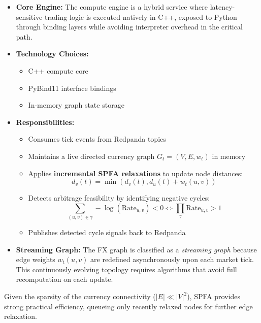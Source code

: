 \documentclass[letterpaper,11pt]{report}
\begin{document}
\begin{itemize}
    \item \textbf{Core Engine:}  
    The compute engine is a hybrid service where latency-sensitive trading logic is executed natively in C++, exposed to Python through binding layers while avoiding interpreter overhead in the critical path.

    \item \textbf{Technology Choices:}
    \begin{itemize}
        \item C++ compute core
        \item PyBind11 interface bindings
        \item In-memory graph state storage
    \end{itemize}

    \item \textbf{Responsibilities:}
    \begin{itemize}
        \item Consumes tick events from Redpanda topics
        \item Maintains a live directed currency graph $G_t = (V, E, w_t)$ in memory
        \item Applies \textbf{incremental SPFA relaxations} to update node distances:
        \begin{equation}
            d_v(t) = \min(d_v(t), d_u(t) + w_t(u,v))
        \end{equation}

        \item Detects arbitrage feasibility by identifying negative cycles:
        \begin{equation}
            \sum_{(u,v)\in \gamma} -\log(\text{Rate}_{u,v}) < 0 \iff \prod_{\gamma} \text{Rate}_{u,v} > 1
        \end{equation}

        \item Publishes detected cycle signals back to Redpanda
    \end{itemize}

    \item \textbf{Streaming Graph:}  
    The FX graph is classified as a \emph{streaming graph} because edge weights $w_t(u,v)$ are redefined asynchronously upon each market tick. This continuously evolving topology requires algorithms that avoid full recomputation on each update.
\end{itemize}

Given the sparsity of the currency connectivity ($|E| \ll |V|^2$), SPFA provides strong practical efficiency, queueing only recently relaxed nodes for further edge relaxation.
\end{document}
